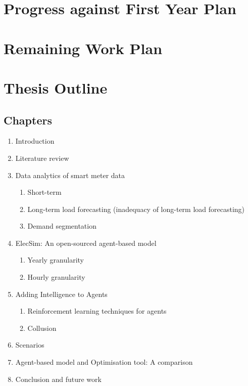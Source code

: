 \documentclass[12pt]{article}
\begin{document}
\section{Progress against First Year Plan}







\clearpage

\section{Remaining Work Plan}








\clearpage

\section{Thesis Outline}

\subsection{Chapters}
\begin{enumerate}

  \item Introduction
  \item Literature review
  \item Data analytics of smart meter data
  \begin{enumerate}
	  \item Short-term 
	  \item Long-term load forecasting (inadequacy of long-term load forecasting)
	  \item Demand segmentation
  \end{enumerate}
  \item ElecSim: An open-sourced agent-based model
    \begin{enumerate}
	  \item Yearly granularity
	  \item Hourly granularity
  \end{enumerate}
  \item Adding Intelligence to Agents
  \begin{enumerate}
	  \item Reinforcement learning techniques for agents
	  \item Collusion
  \end{enumerate}
  \item Scenarios
  \item Agent-based model and Optimisation tool: A comparison
  \item Conclusion and future work
  
\end{enumerate}
\end{document}
